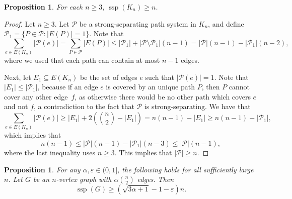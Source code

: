 \documentclass[a4paper, 11pt,reqno]{amsart}
\theoremstyle{plain}
\newtheorem{proposition}[theorem]{Proposition}
\theoremstyle{definition}
\numberwithin{equation}{section}
\DeclareMathOperator{\ssp}{ssp}
\newcommand{\eps}{\varepsilon}
\begin{document}
\begin{proposition} \label{proposition:lowerboundclique}
  For each $n \geq 3$, $\ssp(K_n) \geq n$.
\end{proposition}

\begin{proof}
  Let $n \geq 3$.  Let $\mathcal{P}$ be a strong-separating path
  system in $K_n$, and define $\mathcal{P}_1 = \{ P \in \mathcal{P} :
  |E(P)| = 1 \}$.  Note that
  \[\sum_{e \in E(K_n)} |\mathcal{P}(e)| = \sum_{P \in \mathcal{P}} |E(P)| \leq |\mathcal{P}_1| + |\mathcal{P} \setminus \mathcal{P}_1|(n-1) = |\mathcal{P}| (n-1) - |\mathcal{P}_1|(n-2),\]
  where we used that each path can contain at most $n-1$ edges.
  
  Next, let $E_1 \subseteq E(K_n)$ be the set of edges $e$ such that
  $|\mathcal{P}(e)| = 1$.  Note that $|E_1| \leq |\mathcal{P}_1|$,
  because if an edge $e$ is covered by an unique path $P$, then $P$
  cannot cover any other edge~$f$, as otherwise there would be no
  other path which covers $e$ and not $f$, a contradiction to the fact
  that $\mathcal{P}$ is strong-separating.  We have that
  \[ \sum_{e \in E(K_n)} |\mathcal{P}(e)| \geq |E_1| + 2 \left( \binom{n}{2} - |E_1| \right) = n(n-1) - |E_1| \geq n(n-1) - |\mathcal{P}_1|, \]
  which implies that
  \[ n(n-1) \leq |\mathcal{P}|(n-1) - |\mathcal{P}_1|(n-3) \leq |\mathcal{P}|(n-1), \]
  where the last inequality uses $n \geq 3$.
  This implies that $|\mathcal{P}| \geq n$.
\end{proof}

\begin{proposition} \label{proposition:lowerboundgeneral}
  For any $\alpha, \eps \in (0,1]$, the following holds for all sufficiently large $n$.
  Let $G$ be an $n$-vertex graph with $\alpha \binom{n}{2}$ edges.
  Then
  \[\ssp(G) \geq (\sqrt{3 \alpha + 1} - 1 - \eps)n.\]
\end{proposition}
\end{document}

